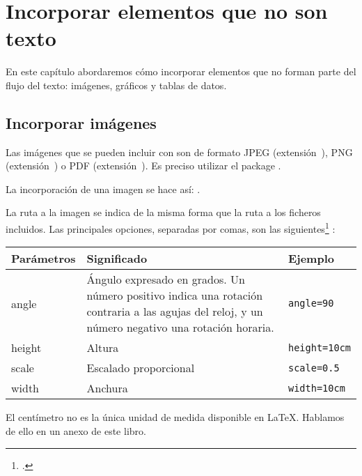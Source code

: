\chapter{Incorporar elementos que no son texto}

\begin{intro}
En este capítulo abordaremos cómo incorporar elementos que no forman parte del flujo del texto: imágenes, gráficos y tablas de datos.
\end{intro}

\section{Incorporar imágenes}

Las imágenes que se pueden incluir con \XeLaTeX son
 de formato JPEG (extensión~), PNG (extensión~) o PDF (extensión~). Es preciso utilizar el package .


La incorporación de una imagen se hace así: .

La ruta a la imagen se indica de la misma forma que la ruta a los ficheros incluidos. Las principales opciones, separadas por comas, son las siguientes\footcite[Para las otras, hay que consultar][]{graphicx_options} :

\begin{longtable}{|p{}|p{}|p{}|}
    \hline
    \centering\textbf{Parámetros} & \centering\textbf{Significado} & \centering\textbf{Ejemplo}    \tabularnewline
    \hline
    \endhead
    \hline
    \endfoot
    angle        & Ángulo expresado en grados. Un número positivo indica una rotación contraria a las agujas del reloj, y un número negativo una rotación horaria.     & \verb|angle=90| \\
    height        & Altura    & \verb|height=10cm|     \\
    scale        & Escalado proporcional & \verb|scale=0.5|\\
    width        & Anchura     & \verb|width=10cm|     \\
\end{longtable}


\begin{plusloins}
El centímetro no es la única unidad de medida disponible en \LaTeX. Hablamos de ello en un anexo de este libro.
\end{plusloins}

